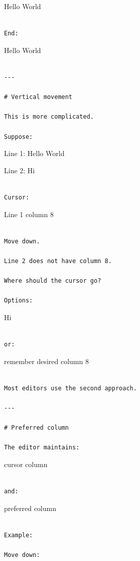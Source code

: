 \documentclass[
  oneside,
  openany]{book}
\begin{document}
\textbar Hello World

\begin{verbatim}

End:
\end{verbatim}

Hello World\textbar{}

\begin{verbatim}

---

# Vertical movement

This is more complicated.

Suppose:
\end{verbatim}

Line 1: Hello World

Line 2: Hi

\begin{verbatim}

Cursor:
\end{verbatim}

Line 1 column 8

\begin{verbatim}

Move down.

Line 2 does not have column 8.

Where should the cursor go?

Options:
\end{verbatim}

Hi\textbar{}

\begin{verbatim}

or:
\end{verbatim}

remember desired column 8

\begin{verbatim}

Most editors use the second approach.

---

# Preferred column

The editor maintains:
\end{verbatim}

cursor column

\begin{verbatim}

and:
\end{verbatim}

preferred column

\begin{verbatim}

Example:

Move down:
\end{verbatim}
\end{document}
